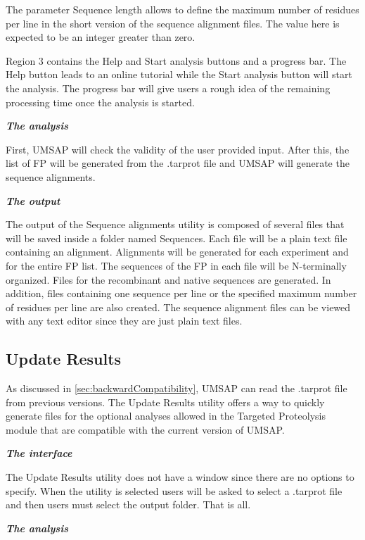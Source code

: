 The parameter Sequence length allows to define the maximum number of residues per line in the short version of the sequence alignment files. The value here is expected to be an integer greater than zero.

Region \num{3} contains the Help and Start analysis buttons and a progress bar. The Help button leads to an online tutorial while the Start analysis button will start the analysis. The progress bar will give users a rough idea of the remaining processing time once the analysis is started.

\textit{\textbf{The analysis}}

First, UMSAP will check the validity of the user provided input. After this, the list of FP will be generated from the .tarprot file and UMSAP will generate the sequence alignments.

\textit{\textbf{The output}}

The output of the Sequence alignments utility is composed of several files that will be saved inside a folder named Sequences. Each file will be a plain text file containing an alignment. Alignments will be generated for each experiment and for the entire FP list. The sequences of the FP in each file will be N-terminally organized. Files for the recombinant and native sequences are generated. In addition, files containing one sequence per line or the specified maximum number of residues per line are also created. The sequence alignment files can be viewed with any text editor since they are just plain text files.

\subsection{Update Results}
\label{subsec:utilUpdateRes}

As discussed in \autoref{sec:backwardCompatibility}, UMSAP can read the .tarprot file from previous versions. The Update Results utility offers a way to quickly generate files for the optional analyses allowed in the Targeted Proteolysis module that are compatible with the current version of UMSAP.

\textit{\textbf{The interface}}

The Update Results utility does not have a window since there are no options to specify. When the utility is selected users will be asked to select a .tarprot file and then users must select the output folder. That is all.

\textit{\textbf{The analysis}}

